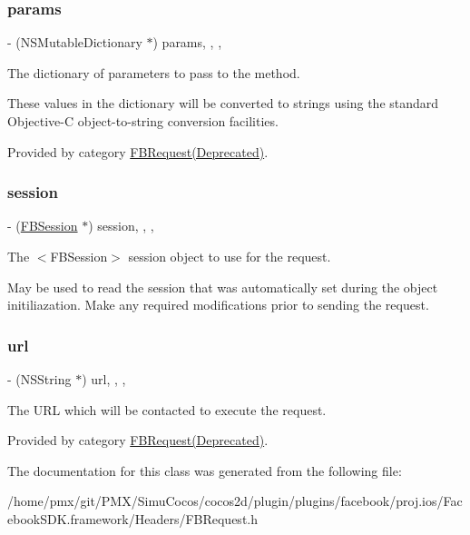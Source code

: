\subsubsection{\texorpdfstring{params}{params}}
{\footnotesize\ttfamily -\/ (N\+S\+Mutable\+Dictionary $\ast$) params\hspace{0.3cm}{\ttfamily [read]}, {\ttfamily [write]}, {\ttfamily [nonatomic]}, {\ttfamily [retain]}}

The dictionary of parameters to pass to the method.

These values in the dictionary will be converted to strings using the standard Objective-\/C object-\/to-\/string conversion facilities. 

Provided by category \hyperlink{categoryFBRequest_07Deprecated_08_abc65f409227938e45243e9aa31c3f1d5}{F\+B\+Request(\+Deprecated)}.

\mbox{\label{interfaceFBRequest_a06b3fcf0ba6f0a5719833165b9816ec7}} 
\subsubsection{\texorpdfstring{session}{session}}
{\footnotesize\ttfamily -\/ (\hyperlink{interfaceFBSession}{F\+B\+Session} $\ast$) session\hspace{0.3cm}{\ttfamily [read]}, {\ttfamily [write]}, {\ttfamily [nonatomic]}, {\ttfamily [retain]}}

The $<$\+F\+B\+Session$>$ session object to use for the request.

May be used to read the session that was automatically set during the object initiliazation. Make any required modifications prior to sending the request. \mbox{\label{interfaceFBRequest_ac05e6fc5503b9806a900c423ce1f65d5}} 
\subsubsection{\texorpdfstring{url}{url}}
{\footnotesize\ttfamily -\/ (N\+S\+String $\ast$) url\hspace{0.3cm}{\ttfamily [read]}, {\ttfamily [write]}, {\ttfamily [nonatomic]}, {\ttfamily [copy]}}

The U\+RL which will be contacted to execute the request. 

Provided by category \hyperlink{categoryFBRequest_07Deprecated_08_ac05e6fc5503b9806a900c423ce1f65d5}{F\+B\+Request(\+Deprecated)}.



The documentation for this class was generated from the following file\+:\begin{DoxyCompactItemize}
\item 
/home/pmx/git/\+P\+M\+X/\+Simu\+Cocos/cocos2d/plugin/plugins/facebook/proj.\+ios/\+Facebook\+S\+D\+K.\+framework/\+Headers/F\+B\+Request.\+h\end{DoxyCompactItemize}
